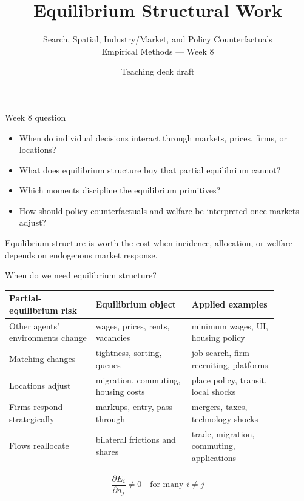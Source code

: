 \documentclass[aspectratio=169,11pt]{beamer}
\title{Equilibrium Structural Work}
\subtitle{Search, Spatial, Industry/Market, and Policy Counterfactuals \\ Empirical Methods --- Week 8}
\author{Teaching deck draft}
\date{}
\newcommand{\1}{\mathbf{1}}
\begin{document}
\begin{frame}
  \titlepage
\end{frame}

\begin{frame}{Week 8 question}
\begin{itemize}
    \item When do individual decisions interact through markets, prices, firms, or locations?
    \item What does equilibrium structure buy that partial equilibrium cannot?
    \item Which moments discipline the equilibrium primitives?
    \item How should policy counterfactuals and welfare be interpreted once markets adjust?
\end{itemize}

\medskip
Equilibrium structure is worth the cost when incidence, allocation, or welfare depends on endogenous market response.
\end{frame}

\begin{frame}{When do we need equilibrium structure?}
\small
\begin{tabular}{p{0.28\linewidth} p{0.31\linewidth} p{0.29\linewidth}}
\toprule
Partial-equilibrium risk & Equilibrium object & Applied examples \\
\midrule
Other agents' environments change & wages, prices, rents, vacancies & minimum wages, UI, housing policy \\
Matching changes & tightness, sorting, queues & job search, firm recruiting, platforms \\
Locations adjust & migration, commuting, housing costs & place policy, transit, local shocks \\
Firms respond strategically & markups, entry, pass-through & mergers, taxes, technology shocks \\
Flows reallocate & bilateral frictions and shares & trade, migration, commuting, applications \\
\bottomrule
\end{tabular}

\[
\frac{\partial E_i}{\partial a_j} \neq 0
\quad \text{for many } i \neq j
\]
\end{frame}
\end{document}
